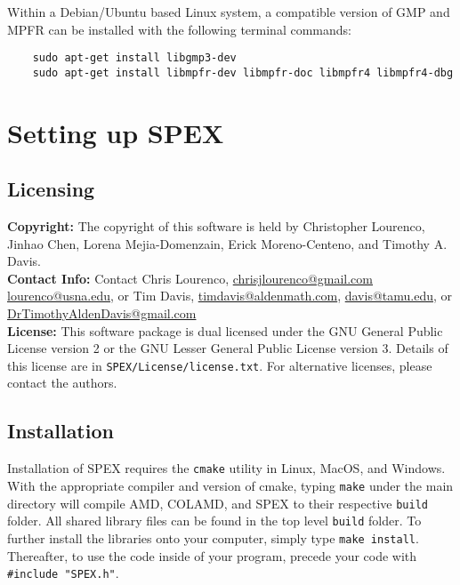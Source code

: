 \documentclass[12pt]{report}
\theoremstyle{definition}
\begin{document}
Within a Debian/Ubuntu based Linux system, a compatible version of GMP and MPFR can be installed with the following terminal commands:

{\small
\begin{verbatim}
    sudo apt-get install libgmp3-dev
    sudo apt-get install libmpfr-dev libmpfr-doc libmpfr4 libmpfr4-dbg
\end{verbatim} }

\chapter{Setting up SPEX}

\section{Licensing} \label{s:util:licensing}

\textbf{Copyright:} The copyright of this software is held by Christopher Lourenco, Jinhao Chen, Lorena Mejia-Domenzain, Erick Moreno-Centeno, and Timothy A. Davis.\\

\noindent \textbf{Contact Info:} Contact Chris Lourenco,
\href{mailto:chrisjlourenco@gmail.com}{chrisjlourenco@gmail.com} \href{mailto:lourenco@usna.edu}{lourenco@usna.edu}, or Tim Davis,
\href{mailto:timdavis@aldenmath.com}{timdavis@aldenmath.com},
\href{mailto:davis@tamu.edu}{davis@tamu.edu}, or
\href{DrTimothyAldenDavis@gmail.com}{DrTimothyAldenDavis@gmail.com}\\

\noindent \textbf{License:} This software package is dual licensed under the GNU General Public License version 2 or the GNU Lesser General Public License version 3. Details of this license are in \verb|SPEX/License/license.txt|. For alternative licenses, please contact the authors.


\section{Installation} \label{s:util:install}

Installation of SPEX requires the \verb|cmake| utility in Linux, MacOS, and Windows. 
With the appropriate compiler and version of cmake, typing \verb|make| under the main 
directory will compile AMD, COLAMD, and SPEX to their respective \verb|build| folder.
All shared library files can be found in the top level \verb|build| folder. To further
install the libraries onto your computer, simply type \verb|make install|.  Thereafter, 
to use the code inside of your program, precede your code with \newline \verb|#include "SPEX.h"|.
\end{document}
